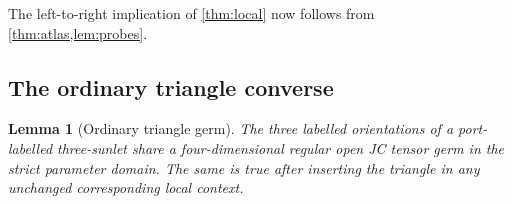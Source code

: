 \documentclass[11pt]{article}
\newtheorem{lemma}[theorem]{Lemma}
\theoremstyle{remark}
\begin{document}
The left-to-right implication of \cref{thm:local} now follows from
\cref{thm:atlas,lem:probes}.

\subsection{The ordinary triangle converse}

\begin{lemma}[Ordinary triangle germ]\label{lem:T-germ}
The three labelled orientations of a port-labelled three-sunlet share a
four-dimensional regular open JC tensor germ in the strict parameter domain.
The same is true after inserting the triangle in any unchanged corresponding
local context.
\end{lemma}


\end{document}

